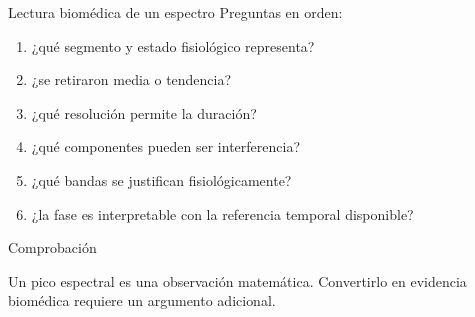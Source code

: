 \documentclass[
  10pt,
  ignorenonframetext,
  aspectratio=169,
  spanish,
]{beamer}
\providecommand{\tightlist}{%
  \setlength{\itemsep}{0pt}\setlength{\parskip}{0pt}}
\begin{document}
\begin{frame}{Lectura biomédica de un espectro}
\label{d1-100}
Preguntas en orden:

\begin{enumerate}
\tightlist
\item
  ¿qué segmento y estado fisiológico representa?
\item
  ¿se retiraron media o tendencia?
\item
  ¿qué resolución permite la duración?
\item
  ¿qué componentes pueden ser interferencia?
\item
  ¿qué bandas se justifican fisiológicamente?
\item
  ¿la fase es interpretable con la referencia temporal disponible?
\end{enumerate}

\begin{block}{Comprobación}

Un pico espectral es una observación matemática. Convertirlo en
evidencia biomédica requiere un argumento adicional.

\end{block}

\end{frame}
\end{document}
